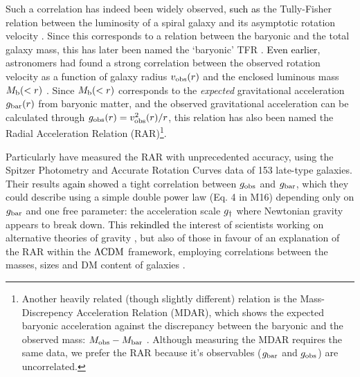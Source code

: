\documentclass[usenatbib]{mnras}
\newcommand{\lcdm}{{\rm \Lambda CDM}}
\newcommand{\un}[1]{_{\rm #1}}
\begin{document}
Such a correlation has indeed been widely observed, \textcolor{black}{such as} the Tully-Fisher relation \cite[TFR,][]{tully1977} between the luminosity of a spiral galaxy and its asymptotic rotation velocity \cite[]{pierce1988,bernstein1994}. Since this corresponds to a relation between the baryonic and the total galaxy mass, this has later been named the `baryonic' TFR \cite[BTFR,][]{mcgaugh2000,mcgaugh2012}. \textcolor{black}{Even earlier}, astronomers had found a strong correlation between the observed rotation velocity as a function of galaxy radius $v\un{obs}(r)$ and the enclosed luminous mass \mbox{$M\un{b}(<r)$} \cite[]{sanders1986,sanders1996,mcgaugh2004,sanders2007,wu2015}. Since $M\un{b}(<r)$ corresponds to the \emph{expected} gravitational acceleration $g\un{bar}(r)$ from baryonic matter, and the observed gravitational acceleration can be calculated through $g\un{obs}(r)=v\un{obs}^2(r)/r$, this relation has also been named the Radial Acceleration Relation (RAR)\footnote{Another heavily related (though slightly different) relation is the Mass-Discrepency Acceleration Relation (MDAR), which shows the expected baryonic acceleration against the discrepancy between the baryonic and the observed mass: $M\un{obs}-M\un{bar}$ \cite[see][]{mcgaugh2004}. Although measuring the MDAR requires the same data, we prefer the RAR because it's observables ($g\un{bar}$ and $g\un{obs}$) are uncorrelated.}.

Particularly \citet[][hereafter M16]{mcgaugh2016} have measured the RAR with unprecedented accuracy, using the Spitzer Photometry and Accurate Rotation Curves \cite[SPARC,][]{lelli2016b} data of 153 late-type galaxies. Their results \textcolor{black}{again} showed a tight correlation between $g\un{obs}$ and $g\un{bar}$, which they could describe using a simple double power law (Eq. 4 in M16) depending only on $g\un{bar}$ and one free parameter: the acceleration scale $g\un{\dagger}$ where Newtonian gravity appears to break down. This \textcolor{black}{rekindled} the interest of scientists working on alternative theories of gravity \cite[]{lelli2017a,lelli2017b,burrage2017,li2018,obrien2019}, but also of those in favour of an explanation of the RAR within the $\lcdm$ framework, employing correlations between the masses, sizes and DM content of galaxies \cite[]{keller2017,desmond2017,ludlow2017,tenneti2018}.
\end{document}
